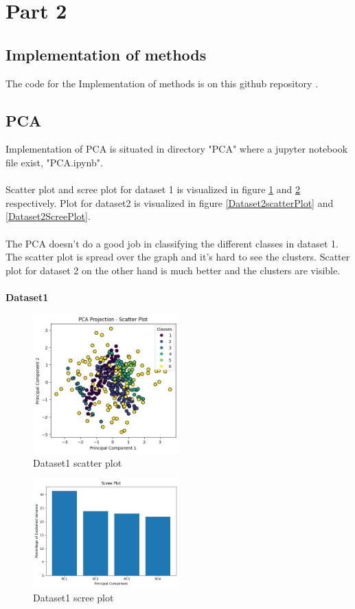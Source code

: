 \documentclass[12pt]{report}
\begin{document}
	\section{Part 2}
	\subsection{Implementation of methods}
	The code for the Implementation of methods is on this github repository \cite{GitHubRepo}. 
	\subsection{PCA}
	Implementation of PCA is situated in directory "PCA" where a jupyter notebook file exist, "PCA.ipynb". \\
	\\
	Scatter plot and scree plot for dataset 1 is visualized in figure \ref{Dataset1scatterPlot} and \ref{Dataset1ScreePlot} respectively. Plot for dataset2 is visualized
	in figure \ref{Dataset2scatterPlot} and \ref{Dataset2ScreePlot}.\\
	\\
	The PCA doesn't do a good job in classifying the different classes in dataset 1. The scatter plot is spread over the graph and it's hard to see the clusters. Scatter plot for dataset 2 on the other hand is much better and the clusters are visible.\\
	\\
	\textbf{Dataset1}\\
	\begin{figure}[H]
		\centering
		\includegraphics[width=0.5\textwidth]{../PCA/OutputPlot/Dataset1/Dataset1scatterPlot.png}
		\caption{Dataset1 scatter plot}
		\label{Dataset1scatterPlot}
	\end{figure}
	\begin{figure}[H]
		\centering
		\includegraphics[width=0.5\textwidth]{../PCA/OutputPlot/Dataset1/Dataset1ScreePlot.png}
		\caption{Dataset1 scree plot}
		\label{Dataset1ScreePlot}
	\end{figure}
\end{document}

